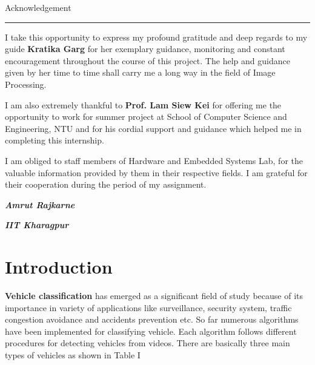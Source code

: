 \documentclass[a4paper,12pt]{article}
\begin{document}
	\newpage
	\begin{center}
		\vspace*{1in}
		{\LARGE Acknowledgement}
		\vspace{0.1in}
		\hrule
		\vspace{0.1in}
	\end{center}
	\vspace{0.25in}
	I take this opportunity to express my profound gratitude and deep regards to my guide \textbf{Kratika Garg} for her exemplary guidance, monitoring and constant encouragement throughout the course of this project. The help and guidance given by her time to time shall carry me a long way in the field of Image Processing.
	\begin{flushleft}
	I am also extremely thankful to \textbf{Prof. Lam Siew Kei} for offering me the opportunity to work for summer project at School of Computer Science and Engineering, NTU and for his cordial support and guidance which helped me in completing this internship. 
	\end{flushleft}
	\begin{flushleft}
	I am obliged to staff members of Hardware and Embedded Systems Lab, for the valuable information provided by them in their respective fields. I am grateful for their cooperation during the period of my assignment.
	\end{flushleft}
	\vspace{2.5in}
	
	\begin{flushleft}
		\textbf{\textit{Amrut Rajkarne}}
		\par
		\textbf{\textit{IIT Kharagpur}}
	\end{flushleft}


\tableofcontents

\newpage
\section{Introduction}

\vspace{0.1in}
\textbf{Vehicle classification} has emerged as a significant field of study because of its importance in variety of applications like surveillance, security system, traffic congestion avoidance and accidents prevention etc. So far numerous algorithms have been implemented for
classifying vehicle. Each algorithm follows different procedures for detecting vehicles from videos. There are basically three main types of vehicles as shown in Table I
\end{document}
